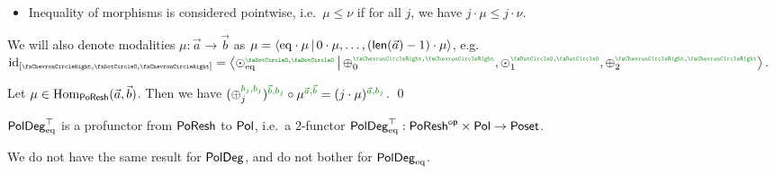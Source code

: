 \documentclass[a4paper]{memoir}
\begin{document}
\begin{definition}
\begin{itemize}
\begin{itemize}
			\item The identity $\id : \vec a \to \vec a$ is given by $i \cdot \id := \dpol i \pospol \pmrhom{a_i}{a_i}$.
			\item Composition $\nu \circ \mu$ is given by $i \cdot (\nu \circ \mu) := (i \cdot \nu) \circ \mu$.
		\end{itemize}
		\item Inequality of morphisms is considered pointwise, i.e.\ $\mu \leq \nu$ if for all $j$, we have $j \cdot \mu \leq j \cdot \nu$.
	\end{itemize}
	We will also denote modalities $\mu : \vec a \to \vec b$ as $\mu = \mathopen{}\left\langle {\mathrm{eq}} \cdot \mu \,\middle|\, 0 \cdot \mu, \ldots, (\mathsf{len}(\vec a) - 1) \cdot \mu \right\rangle\mathclose{}$, e.g.\ $\id_{[\ypolar, \npolar, \ypolar]} = \reshlist{\pdeg \nonpol \eqtydeg \pmrnn}{\pdeg \pospol 0 \pmryy, \pdeg \nonpol 1 \pmrnn, \pdeg \pospol 2 \pmryy}$.
\end{definition}
\begin{corollary} \label{thm:deg-vs-poldeg-poresh}
	Let $\mu \in {\mathrm{Hom}}_{\mathsf{PoResh}}(\vec a, \vec b)$. Then we have $(\pospol_j \pmrhom{b_j}{b_j})\pmrhom{\vec b}{b_j} \circ \mu\pmrhom{\vec a}{\vec b} = (j \cdot \mu)\pmrhom{\vec a}{b_j}$. \qed
\end{corollary}
\begin{proposition}
	$\mathsf{PolDeg}_{\mathrm{eq}}^\top$ is a profunctor from $\mathsf{PoResh}$ to ${\mathsf{Pol}}$, i.e.\ a 2-functor $\mathsf{PolDeg}_{\mathrm{eq}}^\top : \mathsf{PoResh}^{\mathsf{op}} \times {\mathsf{Pol}} \to {\mathsf{Poset}}$.
\end{proposition}
We do not have the same result for $\mathsf{PolDeg}$, and do not bother for $\mathsf{PolDeg}_{\mathrm{eq}}$.
\end{document}
